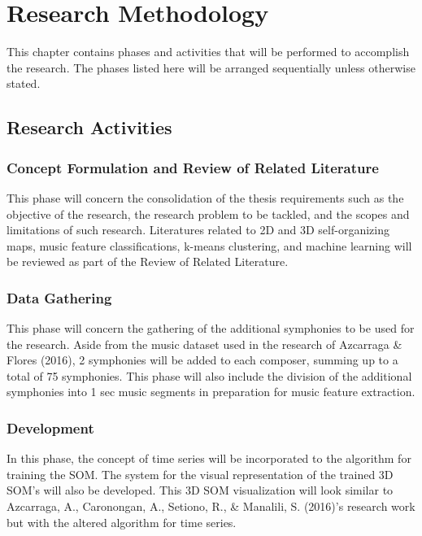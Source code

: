 %
%
%                 

\chapter{Research Methodology}
This chapter contains phases and activities that will be performed to accomplish the research. The phases listed here will be arranged sequentially unless otherwise stated.

\section{Research Activities}
\subsection{Concept Formulation and Review of Related Literature}
This phase will concern the consolidation of the thesis requirements such as the objective of the research, the research problem to be tackled, and the scopes and limitations of such research. Literatures related to 2D and 3D self-organizing maps, music feature classifications, k-means clustering, and  machine learning will be reviewed as part of the Review of Related Literature.

\subsection{Data Gathering}

This phase will concern the  gathering of the additional symphonies to be used for the research. Aside from the music dataset used in the research of Azcarraga \& Flores (2016), 2 symphonies will be added to each composer, summing up to a total of 75 symphonies. This phase will also include the division of the additional symphonies into 1 sec music segments in preparation for music feature extraction. 


\subsection{Development}
In this phase, the concept of time series will be incorporated to the algorithm for training the SOM. The system for the visual representation of the trained 3D SOM’s will also be developed. This 3D SOM visualization will look similar to Azcarraga, A., Caronongan, A., Setiono, R., \& Manalili, S. (2016)’s research work but with the altered algorithm for time series.
